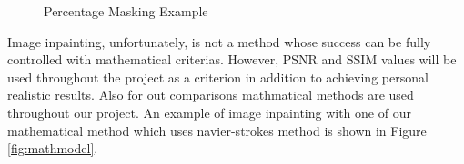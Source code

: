 \begin{figure}[!ht] 
    \centering
        \hspace{0.02\columnwidth}
        \hspace{0.02\columnwidth}
    \vspace*{3mm}
    \caption{Percentage Masking Example}
    \label{fig:percentagemasing}
\end{figure}

Image inpainting, unfortunately, is not a method whose success can be fully controlled with mathematical criterias. However, PSNR and SSIM values will be used throughout the project as a criterion in addition to achieving personal realistic results. Also for out comparisons mathmatical methods are used throughout our project. An example of image inpainting with one of our mathematical method which uses navier-strokes method is shown in Figure \ref{fig:mathmodel}.

